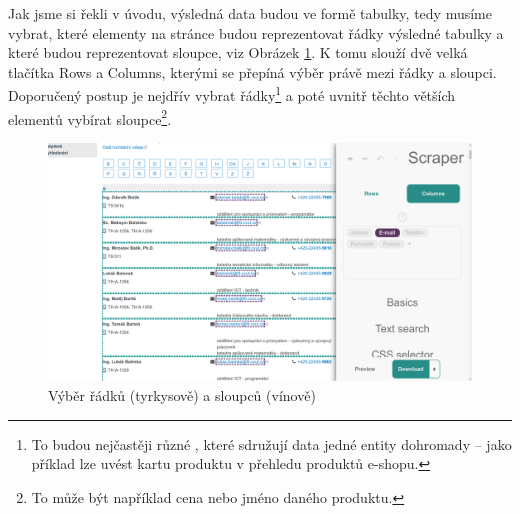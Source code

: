 \documentclass[thesis=B,czech]{FITthesis}[2012/06/26]
\begin{document}
Jak jsme si řekli v úvodu, výsledná data budou ve formě tabulky, tedy musíme vybrat, které elementy na stránce budou reprezentovat řádky výsledné tabulky a které budou reprezentovat sloupce, viz Obrázek \ref{fig:scraper_rows_cols}. K tomu slouží dvě velká tlačítka \textsf{Rows} a \textsf{Columns}, kterými se přepíná výběr právě mezi řádky a sloupci. Doporučený postup je nejdřív vybrat řádky\footnote{To budou nejčastěji různé , které sdružují data jedné entity dohromady -- jako příklad lze uvést kartu produktu v přehledu produktů e-shopu.} a poté uvnitř těchto větších elementů vybírat sloupce\footnote{To může být například cena nebo jméno daného produktu.}.
\begin{figure}
	\includegraphics[width=\linewidth]{images/Scraper_rows_cols.png}
	\caption{Výběr řádků (tyrkysově) a sloupců (vínově)}
	\label{fig:scraper_rows_cols}
\end{figure}
\end{document}
